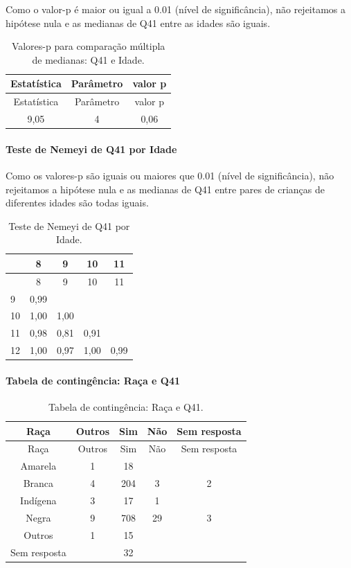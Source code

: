\documentclass[]{article}
\let\oldparagraph\paragraph
\renewcommand{\paragraph}[1]{\oldparagraph{#1}\mbox{}}
\begin{document}
Como o valor-p é maior ou igual a 0.01 (nível de significância), não rejeitamos a hipótese nula e as medianas de Q41 entre as idades são iguais.

\begin{longtable}[]{@{}ccc@{}}
\caption{\label{tab:unnamed-chunk-1633}Valores-p para comparação múltipla de medianas: Q41 e Idade.}\tabularnewline
\toprule
Estatística & Parâmetro & valor p\tabularnewline
\midrule
\endfirsthead
\toprule
Estatística & Parâmetro & valor p\tabularnewline
\midrule
\endhead
9,05 & 4 & 0,06\tabularnewline
\bottomrule
\end{longtable}

\hypertarget{teste-de-nemeyi-de-q41-por-idade}{%
\paragraph{Teste de Nemeyi de Q41 por Idade}\label{teste-de-nemeyi-de-q41-por-idade}}

Como os valores-p são iguais ou maiores que 0.01 (nível de significância), não rejeitamos a hipótese nula e as medianas de Q41 entre pares de crianças de diferentes idades são todas iguais.

\begin{longtable}[]{@{}lcccc@{}}
\caption{\label{tab:unnamed-chunk-1635}Teste de Nemeyi de Q41 por Idade.}\tabularnewline
\toprule
& 8 & 9 & 10 & 11\tabularnewline
\midrule
\endfirsthead
\toprule
& 8 & 9 & 10 & 11\tabularnewline
\midrule
\endhead
9 & 0,99 & & &\tabularnewline
10 & 1,00 & 1,00 & &\tabularnewline
11 & 0,98 & 0,81 & 0,91 &\tabularnewline
12 & 1,00 & 0,97 & 1,00 & 0,99\tabularnewline
\bottomrule
\end{longtable}

\cleardoublepage

\hypertarget{tabela-de-continguxeancia-rauxe7a-e-q41}{%
\paragraph{Tabela de contingência: Raça e Q41}\label{tabela-de-continguxeancia-rauxe7a-e-q41}}

\begin{longtable}[]{@{}ccccc@{}}
\caption{\label{tab:unnamed-chunk-1636}Tabela de contingência: Raça e Q41.}\tabularnewline
\toprule
Raça & Outros & Sim & Não & Sem resposta\tabularnewline
\midrule
\endfirsthead
\toprule
Raça & Outros & Sim & Não & Sem resposta\tabularnewline
\midrule
\endhead
Amarela & 1 & 18 & &\tabularnewline
Branca & 4 & 204 & 3 & 2\tabularnewline
Indígena & 3 & 17 & 1 &\tabularnewline
Negra & 9 & 708 & 29 & 3\tabularnewline
Outros & 1 & 15 & &\tabularnewline
Sem resposta & & 32 & &\tabularnewline
\bottomrule
\end{longtable}
\end{document}
